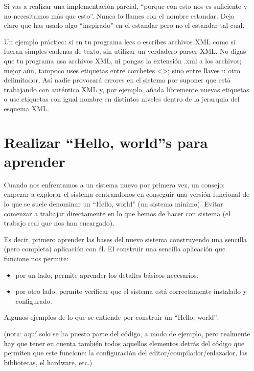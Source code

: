 \documentclass[spanish,12pt,a4paper,final,oneside]{book}
\begin{document}
Si vas a realizar una implementación parcial, ``porque con esto nos es suficiente y no necesitamos más que esto''. Nunca lo llames con el nombre estandar. Deja claro que has usado algo ``inspirado'' en el estandar pero no el estandar tal cual.

Un ejemplo práctico: si en tu programa lees o escribes archivos XML como si fueran simples cadenas de texto; sin utilizar un verdadero parser XML. No digas que tu programa usa archivos XML, ni pongas la extensión .xml a los archivos; mejor aún, tampoco uses etiquetas entre corchetes <>; sino entre llaves {} u otro delimitador. Así nadie provocará errores en el sistema por suponer que está trabajando con auténtico XML y, por ejemplo, añada libremente nuevas etiquetas o use etiquetas con igual nombre en distintos niveles dentro de la jerarquia del esquema XML.


\section{Realizar ``Hello, world''s para aprender}
Cuando nos enfrentamos a un sistema nuevo por primera vez, un consejo: empezar a explorar el sistema centrandonos en conseguir una versión funcional de lo que se suele denominar un ``Hello, world'' (un sistema mínimo).  Evitar comenzar a trabajar directamente en lo que hemos de hacer con sistema (el trabajo real que nos han encargado).

Es decir, primero aprender las bases del nuevo sistema construyendo una sencilla (pero completa) aplicación con él.
El construir una sencilla aplicación que funcione nos permite:
\begin{itemize}
\item por un lado, permite aprender los detalles básicos necesarios;
\item por otro lado, permite verificar que el sistema está correctamente instalado y configurado. 
\end{itemize}

Algunos ejemplos de lo que se entiende por construir un ``Hello, world'':
\begin{footnotesize}(nota: aquí solo se ha puesto parte del código, a modo de ejemplo, pero realmente hay que tener en cuenta también todos aquellos elementos detrás del código que permiten que este funcione: la configuración del editor/compilador/enlazador, las bibliotecas, el hardware, etc.)\end{footnotesize}
 
\end{document}
